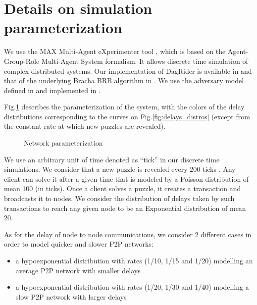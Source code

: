 

\section{Details on simulation parameterization\label{anx:max_sim}}


We use the MAX Multi-Agent eXperimenter tool \cite{max_tool}, which is based on the Agent-Group-Role \cite{from_agents_to_organizations_an_organizational_view_of_multi_agent_systems} Multi-Agent System \cite{an_introduction_to_multiagent_systems} formalism.
It allows discrete time simulation of complex distributed systems.
Our implementation of DagRider \cite{all_you_need_is_dag} is available in \cite{max_dagrider} and that of the underlying Bracha BRB algorithm \cite{on_the_versatility_of_bracha_byzantine_reliable_broadcast_algorithm} in \cite{max_bracha}.
We use the adversary model defined in \cite{adversary_augmented_simulation_to_evaluate_client_fairness_on_hyperledger_fabric} and implemented in \cite{max_p2p_adversarial_model}. 

Fig.\ref{fig:network_param} describes the parameterization of the system, with the colors of the delay distributions corresponding to the curves on Fig.\ref{fig:delays_distros} (except from the constant rate \textcolor{orange}{\faDashboard} at which new puzzles are revealed).


\begin{figure}[h]
\vspace*{-.25cm}
    \centering
    \scalebox{1}{}
    \caption{Network parameterization}
    \label{fig:network_param}
\vspace*{-.25cm}
\end{figure}


We use an arbitrary unit of time denoted as ``tick'' in our discrete time simulations.
We consider that a new puzzle is revealed every 200 ticks \textcolor{orange}{\faDashboard}.
Any client can solve it after a given time that is modeled by a Poisson distribution \textcolor{yellow}{\faLightbulbO} of mean 100 (in ticks).
Once a client solves a puzzle, it creates a transaction and broadcasts it to nodes.
We consider the \textcolor{red}{\faHourglassO} distribution of delays taken by such transactions to reach any given node to be an Exponential distribution of mean 20.

As for the delay \textcolor{black}{\faClockO} of node to node communications, we consider 2 different cases in order to model quicker and slower P2P networks:
\begin{itemize}
    \item a hypoexponential distribution \textcolor{blue}{\faClockO} with rates (1/10, 1/15 and 1/20) modelling an average P2P network with smaller delays
    \item a hypoexponential distribution \textcolor{green}{\faClockO} with rates (1/20, 1/30 and 1/40) modelling a slow P2P network with larger delays
\end{itemize}


